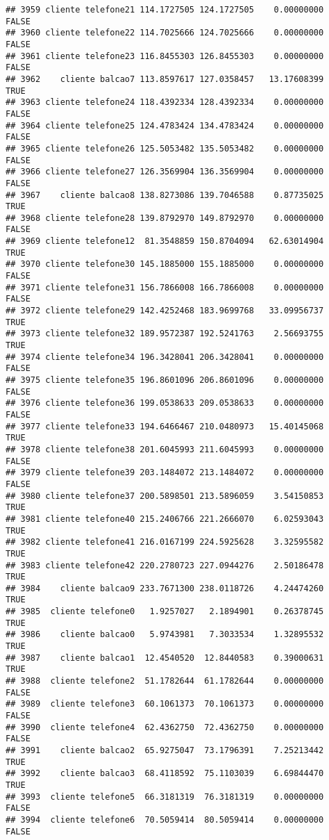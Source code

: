 \documentclass[
]{article}
\begin{document}
\begin{verbatim}
## 3959 cliente telefone21 114.1727505 124.1727505    0.00000000    FALSE
## 3960 cliente telefone22 114.7025666 124.7025666    0.00000000    FALSE
## 3961 cliente telefone23 116.8455303 126.8455303    0.00000000    FALSE
## 3962    cliente balcao7 113.8597617 127.0358457   13.17608399     TRUE
## 3963 cliente telefone24 118.4392334 128.4392334    0.00000000    FALSE
## 3964 cliente telefone25 124.4783424 134.4783424    0.00000000    FALSE
## 3965 cliente telefone26 125.5053482 135.5053482    0.00000000    FALSE
## 3966 cliente telefone27 126.3569904 136.3569904    0.00000000    FALSE
## 3967    cliente balcao8 138.8273086 139.7046588    0.87735025     TRUE
## 3968 cliente telefone28 139.8792970 149.8792970    0.00000000    FALSE
## 3969 cliente telefone12  81.3548859 150.8704094   62.63014904     TRUE
## 3970 cliente telefone30 145.1885000 155.1885000    0.00000000    FALSE
## 3971 cliente telefone31 156.7866008 166.7866008    0.00000000    FALSE
## 3972 cliente telefone29 142.4252468 183.9699768   33.09956737     TRUE
## 3973 cliente telefone32 189.9572387 192.5241763    2.56693755     TRUE
## 3974 cliente telefone34 196.3428041 206.3428041    0.00000000    FALSE
## 3975 cliente telefone35 196.8601096 206.8601096    0.00000000    FALSE
## 3976 cliente telefone36 199.0538633 209.0538633    0.00000000    FALSE
## 3977 cliente telefone33 194.6466467 210.0480973   15.40145068     TRUE
## 3978 cliente telefone38 201.6045993 211.6045993    0.00000000    FALSE
## 3979 cliente telefone39 203.1484072 213.1484072    0.00000000    FALSE
## 3980 cliente telefone37 200.5898501 213.5896059    3.54150853     TRUE
## 3981 cliente telefone40 215.2406766 221.2666070    6.02593043     TRUE
## 3982 cliente telefone41 216.0167199 224.5925628    3.32595582     TRUE
## 3983 cliente telefone42 220.2780723 227.0944276    2.50186478     TRUE
## 3984    cliente balcao9 233.7671300 238.0118726    4.24474260     TRUE
## 3985  cliente telefone0   1.9257027   2.1894901    0.26378745     TRUE
## 3986    cliente balcao0   5.9743981   7.3033534    1.32895532     TRUE
## 3987    cliente balcao1  12.4540520  12.8440583    0.39000631     TRUE
## 3988  cliente telefone2  51.1782644  61.1782644    0.00000000    FALSE
## 3989  cliente telefone3  60.1061373  70.1061373    0.00000000    FALSE
## 3990  cliente telefone4  62.4362750  72.4362750    0.00000000    FALSE
## 3991    cliente balcao2  65.9275047  73.1796391    7.25213442     TRUE
## 3992    cliente balcao3  68.4118592  75.1103039    6.69844470     TRUE
## 3993  cliente telefone5  66.3181319  76.3181319    0.00000000    FALSE
## 3994  cliente telefone6  70.5059414  80.5059414    0.00000000    FALSE

\end{verbatim}
\end{document}
